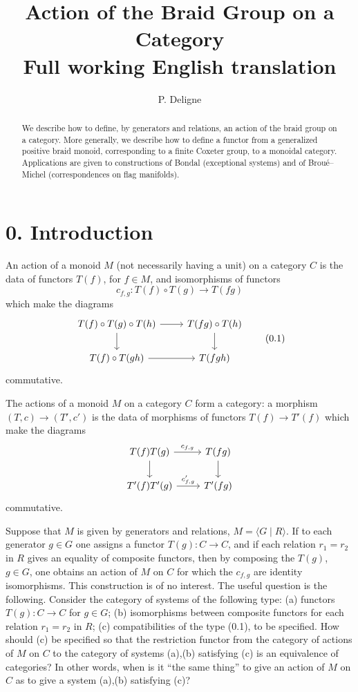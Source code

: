 \documentclass[11pt]{article}
\title{Action of the Braid Group on a Category\\\large Full working English translation}
\author{P. Deligne}
\date{}
\begin{document}
\maketitle

\begin{abstract}
We describe how to define, by generators and relations, an action of the braid group on a category. More generally, we describe how to define a functor from a generalized positive braid monoid, corresponding to a finite Coxeter group, to a monoidal category. Applications are given to constructions of Bondal (exceptional systems) and of Brou\'e--Michel (correspondences on flag manifolds).
\end{abstract}

\tableofcontents

\section*{0. Introduction}
An action of a monoid $M$ (not necessarily having a unit) on a category $C$ is the data of functors $T(f)$, for $f\in M$, and isomorphisms of functors
\[
 c_{f,g}:T(f)\circ T(g)\longrightarrow T(fg)
\]
which make the diagrams
\begin{equation}
\begin{tikzcd}
T(f)\circ T(g)\circ T(h) \arrow[r] \arrow[d] & T(fg)\circ T(h) \arrow[d]\\
T(f)\circ T(gh) \arrow[r] & T(fgh)
\end{tikzcd}\tag{0.1}
\end{equation}
commutative.

The actions of a monoid $M$ on a category $C$ form a category: a morphism $(T,c)\to (T',c')$ is the data of morphisms of functors $T(f)\to T'(f)$ which make the diagrams
\[
\begin{tikzcd}
T(f)T(g) \arrow[r,"c_{f,g}"] \arrow[d] & T(fg) \arrow[d]\\
T'(f)T'(g) \arrow[r,"c'_{f,g}"] & T'(fg)
\end{tikzcd}
\]
commutative.

Suppose that $M$ is given by generators and relations, $M=\langle G\mid R\rangle$. If to each generator $g\in G$ one assigns a functor $T(g):C\to C$, and if each relation $r_1=r_2$ in $R$ gives an equality of composite functors, then by composing the $T(g)$, $g\in G$, one obtains an action of $M$ on $C$ for which the $c_{f,g}$ are identity isomorphisms. This construction is of no interest. The useful question is the following. Consider the category of systems of the following type: (a) functors $T(g):C\to C$ for $g\in G$; (b) isomorphisms between composite functors for each relation $r_1=r_2$ in $R$; (c) compatibilities of the type (0.1), to be specified. How should (c) be specified so that the restriction functor from the category of actions of $M$ on $C$ to the category of systems (a),(b) satisfying (c) is an equivalence of categories? In other words, when is it ``the same thing'' to give an action of $M$ on $C$ as to give a system (a),(b) satisfying (c)?
\end{document}

